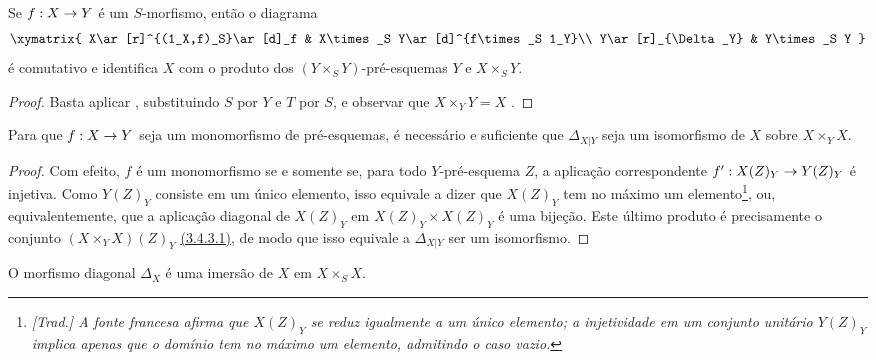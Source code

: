 \documentclass[oneside]{amsart}
\makeatletter
\newcommand{\ega@arrow}[2]{\mathchoice{#1}{#2}{#2}{#2}}
\renewcommand{\to}{\ega@arrow{\longrightarrow}{\rightarrow}}
\let\EGAOriginalLabel\label
\renewcommand{\label}[1]{\phantomsection\EGAOriginalLabel{#1}}
\makeatother
\begin{document}
\begin{corollary}[5.3.7]
\label{I.5.3.7}
Se $f:X\to Y$ é um $S$-morfismo, então o diagrama
\[
  \xymatrix{
    X\ar[r]^{(1_X,f)_S}\ar[d]_f &
    X\times_S Y\ar[d]^{f\times_S 1_Y}\\
    Y\ar[r]_{\Delta_Y} &
    Y\times_S Y
  }
\]
é comutativo e identifica $X$ com o produto dos $(Y\times_S Y)$-pré-esquemas $Y$ e $X\times_S Y$.
\end{corollary}

\begin{proof}
Basta aplicar , substituindo $S$ por $Y$ e $T$ por $S$, e observar que $X\times_Y Y=X$ .
\end{proof}

\begin{proposition}[5.3.8]
\label{I.5.3.8}
Para que $f:X\to Y$ seja um monomorfismo de pré-esquemas, é necessário e suficiente que $\Delta_{X|Y}$ seja um isomorfismo de $X$ sobre $X\times_Y X$.
\end{proposition}

\begin{proof}
Com efeito, $f$ é um monomorfismo se e somente se, para todo $Y$-pré-esquema $Z$, a aplicação correspondente $f':X(Z)_Y\to Y(Z)_Y$ é injetiva.
Como $Y(Z)_Y$ consiste em um único elemento, isso equivale a dizer que $X(Z)_Y$ tem no máximo um elemento\footnote{\emph{[Trad.] A fonte francesa afirma que $X(Z)_Y$ se reduz igualmente a um único elemento; a injetividade em um conjunto unitário $Y(Z)_Y$ implica apenas que o domínio tem no máximo um elemento, admitindo o caso vazio.}}, ou, equivalentemente, que a aplicação diagonal de $X(Z)_Y$ em $X(Z)_Y\times X(Z)_Y$ é uma bijeção.
Este último produto é precisamente o conjunto $(X\times_Y X)(Z)_Y$ \hyperref[I.3.4.3]{(3.4.3.1)}, de modo que isso equivale a $\Delta_{X|Y}$ ser um isomorfismo.
\end{proof}

\begin{proposition}[5.3.9]
\label{I.5.3.9}
O morfismo diagonal $\Delta_X$ é uma imersão de $X$ em $X\times_S X$.
\end{proposition}
\end{document}
